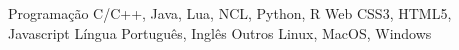 

\begin{cvskills}
  \cvskill
    {Programação} %
    {C/C++, Java, Lua, NCL, Python, R} %
  \cvskill
    {Web} %
    {CSS3, HTML5, Javascript} %
  \cvskill
    {Língua} %
    {Português, Inglês} %
  \cvskill
    {Outros} %
    {Linux, MacOS, Windows} %
\end{cvskills}
